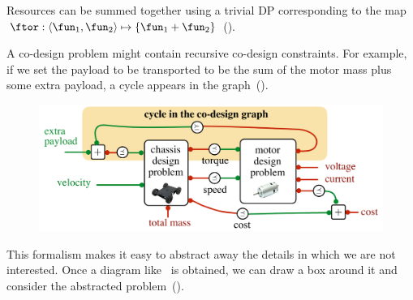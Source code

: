 \begin{example}
\noindent Resources can be summed together using a trivial DP corresponding
to the map $\ftor:\left\langle \fun_{1},\fun_{2}\right\rangle \mapsto\{\fun_{1}+\fun_{2}\}$
().


\noindent A co-design problem might contain recursive co-design constraints.
For example, if we set the payload to be transported to be the sum
of the motor mass plus some extra payload, a cycle appears in the
graph~(). 

\noindent 
\begin{figure}[H]
\centering{}\includegraphics[scale=0.33]{gmcdp_chassis_plus_motor}\caption{\label{fig:gmcdp_chassis_plus_motor}}
\end{figure}

\noindent This formalism makes it easy to abstract away the details
in which we are not interested. Once a diagram like~
is obtained, we can draw a box around it and consider the abstracted
problem~(). 



\end{example}
